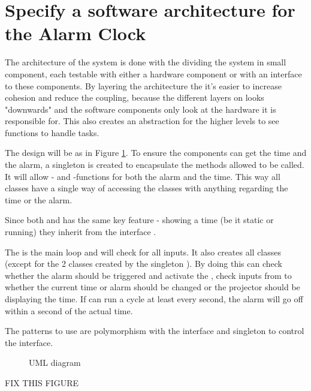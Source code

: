 \documentclass[Main_Assignment3]{subfiles}
\begin{document}
\section{Specify a software architecture for the Alarm Clock}

The architecture of the system is done with the dividing the system in small component, each testable with either a hardware component or with an interface to these components.
By layering the architecture the it's easier to increase cohesion and reduce the coupling, because the different layers on looks "downwards" and the software components only look at the hardware it is responsible for.
This also creates an abstraction for the higher levels to see functions to handle tasks.

The design will be as in Figure \ref{fig:UML}.
To ensure the components can get the time and the alarm, a singleton is created to encapsulate the methods allowed to be called. 
It will allow - and -functions for both the alarm and the time. This way all classes have a single way of accessing the classes with anything regarding the time or the alarm.

Since both  and  has the same key feature - showing a time (be it static or running) they inherit from the interface .

The  is the main loop and will check for all inputs.
It also creates all classes (except for the 2  classes created by the singleton ). 
By doing this  can check whether the alarm should be triggered and activate the , check inputs from  to whether the current time or alarm should be changed or the projector should be displaying the time.
If  can run a cycle at least every second, the alarm will go off within a second of the actual time.

The patterns to use are polymorphism with the interface and singleton to control the interface.

\begin{figure}[hbtp]
\centering
\caption{UML diagram}
\label{fig:UML}
\end{figure}

\huge{FIX THIS FIGURE}
\end{document}
